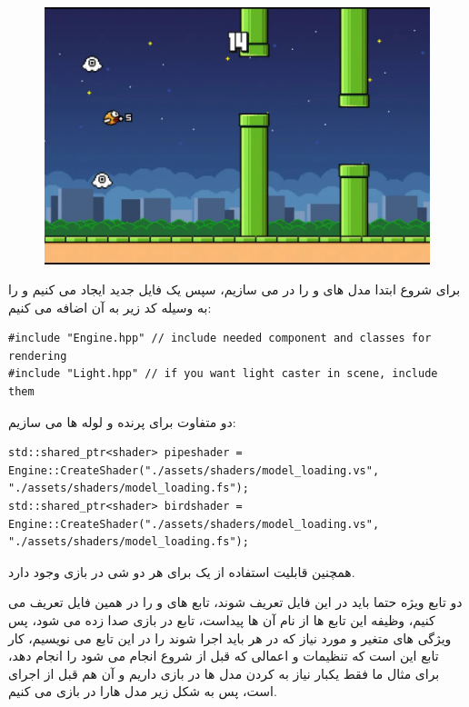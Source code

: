 \documentclass[a4paper, 12pt]{book}
\newcommand{\lrit}[1]{\lr{\textit{#1}}}
\begin{document}
\begin{figure}[H]
    \centering
    \href{https://flappybird.io/}{
        \includegraphics[width=13cm]{images/op-flappybird.png}
    }
    \caption{}
    \label{fig:my_label}
\end{figure}

    برای شروع ابتدا مدل های  و   را در  می سازیم، سپس یک فایل جدید ایجاد می کنیم و  را به وسیله کد زیر به آن اضافه می کنیم:

        \begin{LTR}
    \small
        \begin{lstlisting}[style=C++Style,caption=\lrit{adding Engine to project}]
#include "Engine.hpp" // include needed component and classes for rendering
#include "Light.hpp" // if you want light caster in scene, include them
        \end{lstlisting}
    \end{LTR}
    \normalsize
    \vspace*{0.3cm}

    دو  متفاوت برای پرنده و لوله ها می سازیم:
\begin{LTR}
    \small
        \begin{lstlisting}[style=C++Style,caption=\lrit{creating shaders}]
std::shared_ptr<shader> pipeshader = Engine::CreateShader("./assets/shaders/model_loading.vs", "./assets/shaders/model_loading.fs");
std::shared_ptr<shader> birdshader = Engine::CreateShader("./assets/shaders/model_loading.vs", "./assets/shaders/model_loading.fs");
        \end{lstlisting}
    \end{LTR}
    \normalsize
    \vspace*{0.3cm}
    همچنین قابلیت استفاده از یک  برای هر دو شی در بازی وجود دارد.\par
    دو تابع ویژه حتما باید در این فایل تعریف شوند، تابع های  و  را در همین فایل تعریف می کنیم، وظیفه این تابع ها از نام آن ها پیداست، تابع  در  بازی صدا زده می شود، پس ویژگی های متغیر و مورد نیاز که در هر  باید اجرا شوند را در این تابع می نویسیم، کار تابع  این است که تنظیمات و اعمالی که قبل از شروع  انجام می شود را انجام دهد، برای مثال ما فقط یکبار نیاز به  کردن مدل ها در بازی داریم و آن هم قبل از اجرای  است، پس به شکل زیر مدل هارا در بازی  می کنیم.
\end{document}
